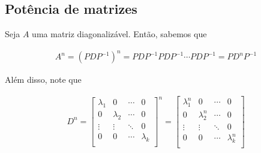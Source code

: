 \documentclass{article}
\begin{document}
\subsection{Potência de matrizes}
\hspace{12pt} Seja $A$ uma matriz diagonalizável. Então, sabemos que

\begin{align*}
A^n = (PDP^{-1})^n = PDP^{-1}PDP^{-1}\cdots PDP^{-1} = PD^nP^{-1} 
\end{align*}

\par\vspace{0.3cm} Além disso, note que

\begin{align*}
D^n = \begin{bmatrix}
\lambda_1 & 0 & \cdots & 0 \\
0 & \lambda_2 & \cdots & 0 \\
\vdots & \vdots & \ddots & 0 \\
0 & 0 & \cdots & \lambda_k \\
\end{bmatrix}^n = \begin{bmatrix}
\lambda_1^n & 0 & \cdots & 0 \\
0 & \lambda_2^n & \cdots & 0 \\
\vdots & \vdots & \ddots & 0 \\
0 & 0 & \cdots & \lambda_k^n \\
\end{bmatrix}
\end{align*}
\end{document}
